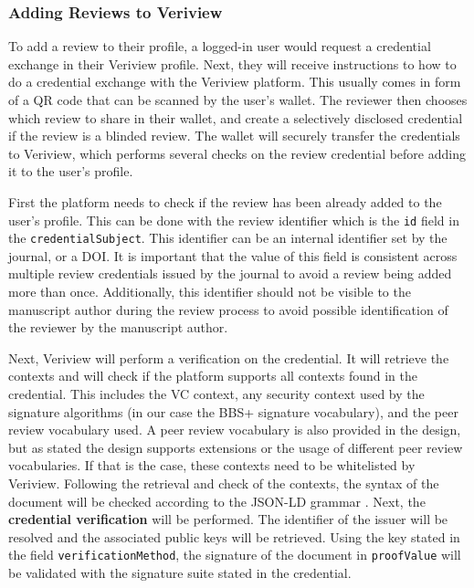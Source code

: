 

\subsubsection{Adding Reviews to Veriview}

To add a review to their profile, a logged-in user would request a credential exchange in their Veriview profile. Next, they will receive instructions to how to do a credential exchange with the Veriview platform. This usually comes in form of a QR code that can be scanned by the user's wallet. The reviewer then chooses which review to share in their wallet, and create a selectively disclosed credential if the review is a blinded review. The wallet will securely transfer the credentials to Veriview, which performs several checks on the review credential before adding it to the user's profile.

First the platform needs to check if the review has been already added to the user's profile. This can be done with the review identifier which is the \lstinline{id} field in the \lstinline{credentialSubject}. This identifier can be an internal identifier set by the journal, or a \acrshort{DOI}. It is important that the value of this field is consistent across multiple review credentials issued by the journal to avoid a review being added more than once. Additionally, this identifier should not be visible to the manuscript author during the review process to avoid possible identification of the reviewer by the manuscript author.

Next, Veriview will perform a verification on the credential. It will retrieve the contexts and will check if the platform supports all contexts found in the credential. This includes the \acrshort{VC} context, any security context used by the signature algorithms (in our case the BBS+ signature vocabulary), and the peer review vocabulary used. A peer review vocabulary is also provided in the design, but as stated the design supports extensions or the usage of different peer review vocabularies. If that is the case, these contexts need to be whitelisted by Veriview. Following the retrieval and check of the contexts, the syntax of the document will be checked according to the \acrshort{JSON-LD} grammar \parencite{jsonld}. Next, the \textbf{credential verification} will be performed. The identifier of the issuer will be resolved and the associated public keys will be retrieved. Using the key stated in the field \lstinline{verificationMethod}, the signature of the document in \lstinline{proofValue} will be validated with the signature suite stated in the credential. 

